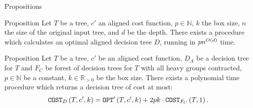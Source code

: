 \begin{frame}{Propositions}
\begin{block}{Proposition}
     Let $T$ be a tree, $c'$ an aligned cost function, $p\in \mathbb{N}$, $k$ the box size, $n$ the size of the original input tree, and $d$ be the depth. There exists a \FDPTimelinesCosts procedure which calculates an optimal aligned decision tree $D$, running in $pn^{O\left( d \right)}$ time.
    \end{block}
\pause 
\begin{block}{Proposition}
     Let $T$ be a tree, $c'$ be an aligned cost function, $D_A$ be a decision tree for $T$ and $F_C$ be forest of decision trees for $T$ with all heavy groups contracted, $p\in \mathbb{N}$ be a constant, $k\in \mathbb{R}_{>0}$ be the box size. There exists a polynomial time \FMergeDTs procedure which returns a decision tree of cost at most:
        $$
            \texttt{COST}_{D}\left( T,c',k \right)=\texttt{OPT}'\left( T,c',k \right)+2pk\cdot \texttt{COST}_{F_C}\left( T,1 \right).
        $$
    \end{block}
\end{frame}


